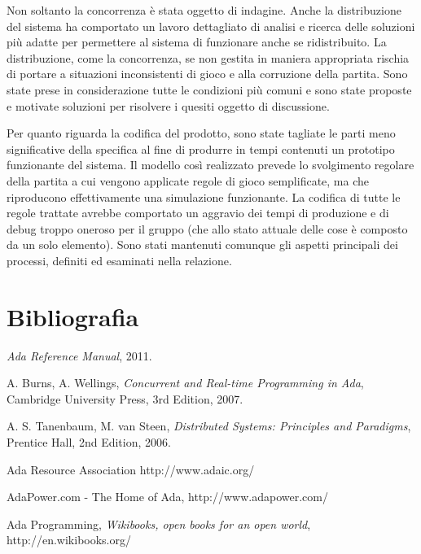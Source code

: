 \documentclass[aps,letterpaper,10pt]{article}
\begin{document}
Non soltanto la concorrenza \`e stata oggetto di indagine. Anche la distribuzione del sistema ha comportato un lavoro dettagliato di analisi e ricerca delle soluzioni pi\`u adatte per permettere al sistema di funzionare anche se ridistribuito. La distribuzione, come la concorrenza, se non gestita in maniera appropriata rischia di portare a situazioni inconsistenti di gioco e alla corruzione della partita. Sono state prese in considerazione tutte le condizioni pi\`u comuni e sono state proposte e motivate soluzioni per risolvere i quesiti oggetto di discussione. \vspace{3mm}

Per quanto riguarda la codifica del prodotto, sono state tagliate le parti meno significative della specifica al fine di produrre in tempi contenuti un prototipo funzionante del sistema. Il modello cos\`i realizzato prevede lo svolgimento regolare della partita a cui vengono applicate regole di gioco semplificate, ma che riproducono effettivamente una simulazione funzionante. La codifica di tutte le regole trattate avrebbe comportato un aggravio dei tempi di produzione e di debug troppo oneroso per il gruppo (che allo stato attuale delle cose \`e composto da un solo elemento). Sono stati mantenuti comunque gli aspetti principali dei processi, definiti ed esaminati nella relazione.

\newpage

\section{Bibliografia}

\begin{thebibliography}{99}

\emph{Ada Reference Manual},
2011.

A. Burns, A. Wellings,
\emph{Concurrent and Real-time Programming in Ada},
Cambridge University Press,
3rd Edition,
2007.

A. S. Tanenbaum, M. van Steen,
\emph{Distributed Systems: Principles and Paradigms},
Prentice Hall,
2nd Edition,
2006.

Ada Resource Association
http://www.adaic.org/

AdaPower.com - The Home of Ada,
http://www.adapower.com/

Ada Programming, 
\emph{Wikibooks, open books for an open world}, 
http://en.wikibooks.org/

\end{thebibliography}
\end{document}
